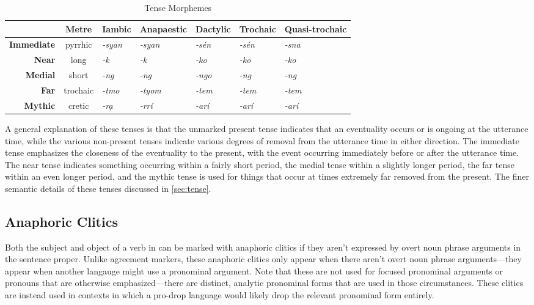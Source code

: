 \begin{table}[h]
    \centering
    \begin{tabular}{@{}rclllll@{}}
        \toprule
        \textbf{} & \textbf{Metre} & \multicolumn{1}{c}{\textbf{Iambic}} & \multicolumn{1}{c}{\textbf{Anapaestic}} & \multicolumn{1}{c}{\textbf{Dactylic}} & \multicolumn{1}{c}{\textbf{Trochaic}} & \multicolumn{1}{c}{\textbf{Quasi-trochaic}} \\ \midrule
        \textbf{Immediate} & pyrrhic & \textit{-syan} & \textit{-syan} & \textit{-sén} & \textit{-sén} & \textit{-sna} \\
        \textbf{Near} & long & \textit{-k} & \textit{-k} & \textit{-ko} & \textit{-ko} & \textit{-ko} \\
        \textbf{Medial} & short & \textit{-ng} & \textit{-ng} & \textit{-ngo} & \textit{-ng} & \textit{-ng} \\
        \textbf{Far} & trochaic & \textit{-tmo} & \textit{-tyom} & \textit{-tem} & \textit{-tem} & \textit{-tem} \\
        \textbf{Mythic} & cretic & \textit{-\supglot{}rạ\suphi{}} & \textit{-\supglot{}rrí} & \textit{-\supglot{}arí} & \textit{-\supglot{}arí} & \textit{-\supglot{}arí} \\ \bottomrule
        \end{tabular}
    \caption{Tense Morphemes}
    \label{tab:tense-morph}
    \end{table}

A general explanation of these tenses is that the unmarked present tense indicates that an eventuality occurs or is ongoing at the utterance time, while the various non-present tenses indicate various degrees of removal from the utterance time in either direction. The immediate tense emphasizes the closeness of the eventuality to the present, with the event occurring immediately before or after the utterance time. The near tense indicates something occurring within a fairly short period, the medial tense within a slightly longer period, the far tense within an even longer period, and the mythic tense is used for things that occur at times extremely far removed from the present. The finer semantic details of these tenses discussed in \autoref{sec:tense}.

\subsection{Anaphoric Clitics}\label{subsec:morph_ana_clit}

Both the subject and object of a verb in \parentlang{} can be marked with anaphoric clitics if they aren't expressed by overt noun phrase arguments in the sentence proper. Unlike agreement markers, these anaphoric clitics only appear when there aren't overt noun phrase arguments---they appear when another langauge might use a pronominal argument. Note that these are not used for focused pronominal arguments or pronouns that are otherwise emphasized---there are distinct, analytic pronominal forms that are used in those circumstances. These clitics are instead used in contexts in which a pro-drop language would likely drop the relevant pronominal form entirely.

